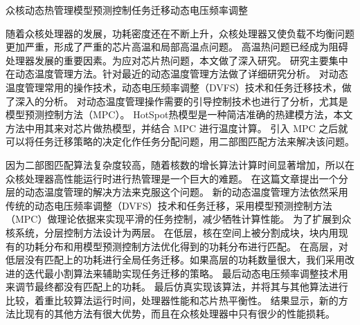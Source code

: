
\begin{Cabstract}{众核}{动态热管理}{模型预测控制}{任务迁移}{动态电压频率调整}

随着众核处理器的发展，功耗密度还在不断上升，众核处理器又使负载不均衡问题更加严重，形成了严重的芯片高温和局部高温点问题。
高温热问题已经成为阻碍处理器发展的重要因素。为应对芯片热问题，本文做了深入研究。
研究主要集中在动态温度管理方法。针对最近的动态温度管理方法做了详细研究分析。
对动态温度管理常用的操作技术，动态电压频率调整（DVFS）技术和任务迁移技术，做了深入的分析。
对动态温度管理操作需要的引导控制技术也进行了分析，尤其是模型预测控制方法（MPC）。
HotSpot热模型是一种简洁准确的热建模方法，本文方法中用其来对芯片做热模型，并结合 MPC 进行温度计算。
引入 MPC 之后就可以将任务迁移策略的决定化作任务分配问题，用二部图匹配方法来解决该问题。

因为二部图匹配算法复杂度较高，随着核数的增长算法计算时间显著增加，所以在众核处理器高性能运行时进行热管理是一个巨大的难题。
在这篇文章提出一个分层的动态温度管理的解决方法来克服这个问题。
新的动态温度管理方法依然采用传统的动态电压频率调整（DVFS）技术和任务迁移，采用模型预测控制方法（MPC）做理论依据来实现平滑的任务控制，减少牺牲计算性能。
为了扩展到众核系统，分层控制方法设计为两层。
在低层，核在空间上被分割成块，块内用现有的功耗分布和用模型预测控制方法优化得到的功耗分布进行匹配。
在高层，对低层没有匹配上的功耗进行全局任务迁移。如果高层的功耗数量很大，我们采用改进的迭代最小割算法来辅助实现任务迁移的策略。
最后动态电压频率调整技术用来调节最终都没有匹配上的功耗。
最后仿真实现该算法，并将其与其他算法进行比较，着重比较算法运行时间，处理器性能和芯片热平衡性。
结果显示，新的方法比现有的其他方法有很大优势，而且在众核处理器中只有很少的性能损耗。
\end{Cabstract}
